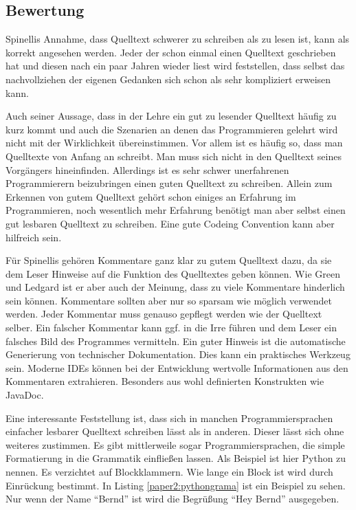 \subsection{Bewertung}
Spinellis Annahme, dass Quelltext schwerer zu schreiben als zu lesen ist, kann als korrekt angesehen werden. Jeder der schon einmal einen Quelltext geschrieben hat und diesen nach ein paar Jahren wieder liest wird feststellen, dass selbst das nachvollziehen der eigenen Gedanken sich schon als sehr kompliziert erweisen kann.

Auch seiner Aussage, dass in der Lehre ein gut zu lesender Quelltext häufig zu kurz kommt und auch die Szenarien an denen das Programmieren gelehrt wird nicht mit der Wirklichkeit übereinstimmen. Vor allem ist es häufig so, dass man Quelltexte von Anfang an schreibt. Man muss sich nicht in den Quelltext seines Vorgängers hineinfinden. Allerdings ist es sehr schwer unerfahrenen Programmierern beizubringen einen guten Quelltext zu schreiben. Allein zum Erkennen von gutem Quelltext gehört schon einiges an Erfahrung im Programmieren, noch wesentlich mehr Erfahrung benötigt man aber selbst einen gut lesbaren Quelltext zu schreiben. Eine gute Codeing Convention kann aber hilfreich sein.

Für Spinellis gehören Kommentare ganz klar zu gutem Quelltext dazu, da sie dem Leser Hinweise auf die Funktion des Quelltextes geben können. Wie Green und Ledgard ist er aber auch der Meinung, dass zu viele Kommentare hinderlich sein können. Kommentare sollten aber nur so sparsam wie möglich verwendet werden. Jeder Kommentar muss genauso gepflegt werden wie der Quelltext selber. Ein falscher Kommentar kann ggf. in die Irre führen und dem Leser ein falsches Bild des Programmes vermitteln. Ein guter Hinweis ist die automatische Generierung von technischer Dokumentation. Dies kann ein praktisches Werkzeug sein. Moderne IDEs können bei der Entwicklung wertvolle Informationen aus den Kommentaren extrahieren. Besonders aus wohl definierten Konstrukten wie JavaDoc.

Eine interessante Feststellung ist, dass sich in manchen Programmiersprachen einfacher lesbarer Quelltext schreiben lässt als in anderen. Dieser lässt sich ohne weiteres zustimmen. Es gibt mittlerweile sogar Programmiersprachen, die simple Formatierung in die Grammatik einfließen lassen. Als Beispiel ist hier Python zu nennen. Es verzichtet auf Blockklammern. Wie lange ein Block ist wird durch Einrückung bestimmt. In Listing \ref{paper2:pythongrama} ist ein Beispiel zu sehen. Nur wenn der Name \enquote{Bernd} ist wird die Begrüßung \enquote{Hey Bernd} ausgegeben.

